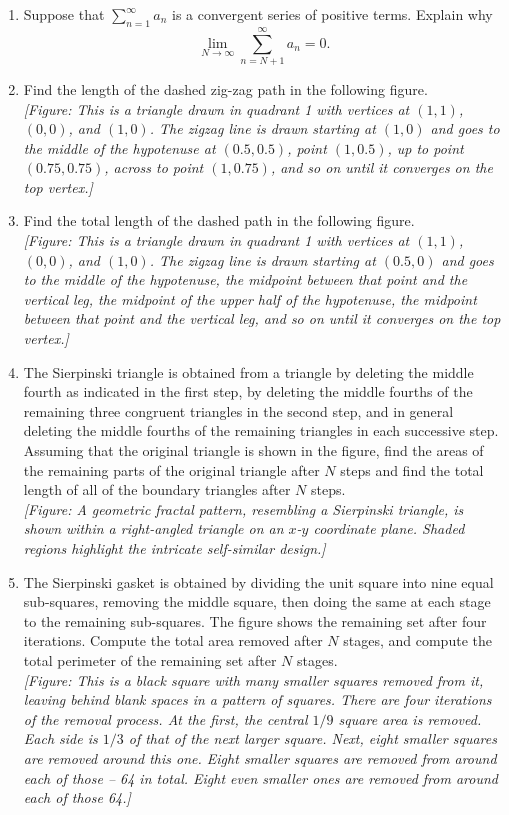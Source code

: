 \documentclass{exercises}
\begin{document}
\begin{enumerate}[resume]
\item \techrequired Suppose that $\sum_{n=1}^{\infty}a_{n}$ is a convergent series of positive terms. Explain why
\[
\lim_{N\to\infty}\sum_{n=N+1}^{\infty}a_{n}=0.
\]
\item \techrequired Find the length of the dashed zig-zag path in the following figure. \\ \textit{[Figure: This is a triangle drawn in quadrant 1 with vertices at $(1,1)$, $(0,0)$, and $(1,0)$. The zigzag line is drawn starting at $(1,0)$ and goes to the middle of the hypotenuse at $(0.5,0.5)$, point $(1,0.5)$, up to point $(0.75,0.75)$, across to point $(1,0.75)$, and so on until it converges on the top vertex.]}
\item \techrequired Find the total length of the dashed path in the following figure. \\ \textit{[Figure: This is a triangle drawn in quadrant 1 with vertices at $(1,1)$, $(0,0)$, and $(1,0)$. The zigzag line is drawn starting at $(0.5,0)$ and goes to the middle of the hypotenuse, the midpoint between that point and the vertical leg, the midpoint of the upper half of the hypotenuse, the midpoint between that point and the vertical leg, and so on until it converges on the top vertex.]}
\item \techrequired The Sierpinski triangle is obtained from a triangle by deleting the middle fourth as indicated in the first step, by deleting the middle fourths of the remaining three congruent triangles in the second step, and in general deleting the middle fourths of the remaining triangles in each successive step. Assuming that the original triangle is shown in the figure, find the areas of the remaining parts of the original triangle after $N$ steps and find the total length of all of the boundary triangles after $N$ steps. \\ \textit{[Figure: A geometric fractal pattern, resembling a Sierpinski triangle, is shown within a right-angled triangle on an $x$-$y$ coordinate plane. Shaded regions highlight the intricate self-similar design.]}
\item \techrequired The Sierpinski gasket is obtained by dividing the unit square into nine equal sub-squares, removing the middle square, then doing the same at each stage to the remaining sub-squares. The figure shows the remaining set after four iterations. Compute the total area removed after $N$ stages, and compute the total perimeter of the remaining set after $N$ stages. \\ \textit{[Figure: This is a black square with many smaller squares removed from it, leaving behind blank spaces in a pattern of squares. There are four iterations of the removal process. At the first, the central $1/9$ square area is removed. Each side is $1/3$ of that of the next larger square. Next, eight smaller squares are removed around this one. Eight smaller squares are removed from around each of those -- 64 in total. Eight even smaller ones are removed from around each of those 64.]}
\end{enumerate}
\end{document}
